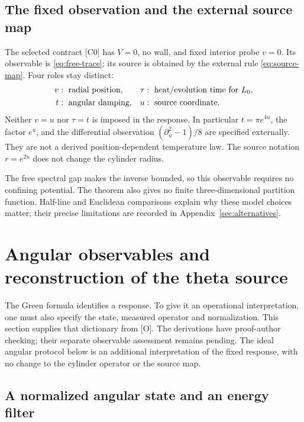 \documentclass[11pt,letterpaper]{article}
\numberwithin{equation}{section}
\theoremstyle{remark}
\newcommand{\evid}[1]{\textsf{[#1]}}
\begin{document}
\subsection{The fixed observation and the external source map}

The selected contract \evid{C0} has \(V=0\), no wall, and fixed interior probe \(v=0\).
Its observable is \eqref{eq:free-trace}; its source is obtained by the
external rule \eqref{eq:source-map}. Four roles stay distinct:
\[
 \begin{aligned}
 v&:\ \hbox{radial position},&
 \tau&:\ \hbox{heat/evolution time for }L_0,\\
 t&:\ \hbox{angular damping},&
 u&:\ \hbox{source coordinate}.
 \end{aligned}
\]
Neither \(v=u\) nor \(\tau=t\) is imposed in the response. In
particular \(t=\pi e^{4u}\), the factor \(e^u\), and the differential
observation \((\partial_u^2-1)/8\) are specified externally.
They are not a derived position-dependent temperature law.
The source notation \(r=e^{2u}\) does not change the cylinder radius.

The free spectral gap makes the inverse bounded, so this observable
requires no confining potential. The theorem also gives no finite
three-dimensional partition function. Half-line and Euclidean
comparisons explain why these model choices matter; their precise
limitations are recorded in Appendix~\ref{sec:alternatives}.

\section{Angular observables and reconstruction of the theta source}
\label{sec:observables}

The Green formula identifies a response. To give it an operational
interpretation, one must also specify the state, measured operator and
normalization. This section supplies that dictionary from \evid{O}.
The derivations have proof-author checking; their separate observable
assessment remains pending. The ideal angular protocol below is an
additional interpretation of the fixed response, with no change to
the cylinder operator or the source map.

\subsection{A normalized angular state and an energy filter}
\end{document}
